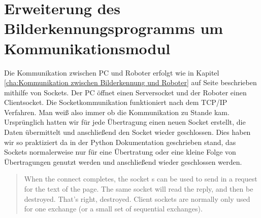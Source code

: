 \section{Erweiterung des Bilderkennungsprogramms um Kommunikationsmodul}
Die Kommunikation zwischen PC und Roboter erfolgt wie in Kapitel \ref{cha:Kommunikation zwischen Bilderkennung und Roboter} auf Seite \pageref{cha:Kommunikation zwischen Bilderkennung und Roboter} beschrieben mithilfe von Sockets. Der PC öffnet einen Serversocket und der Roboter einen Clientsocket. Die Socketkommunikation funktioniert nach dem TCP/IP Verfahren. Man weiß also immer ob die Kommunikation zu Stande kam.
Ursprünglich hatten wir für jede Übertragung einen neuen Socket erstellt, die Daten übermittelt und anschließend den Socket wieder geschlossen. Dies haben wir so praktiziert da in der Python Dokumentation geschrieben stand, das Sockets normalerweise nur für eine Übertratung oder eine kleine Folge von Übertragungen genutzt werden und anschließend wieder geschlossen werden.
\begin{quote}
When the connect completes, the socket s can be used to send in a request for the text of the page. The same socket will read the reply, and then be destroyed. That’s right, destroyed. Client sockets are normally only used for one exchange (or a small set of sequential exchanges).\cite{Python-Doku}
\end{quote}
